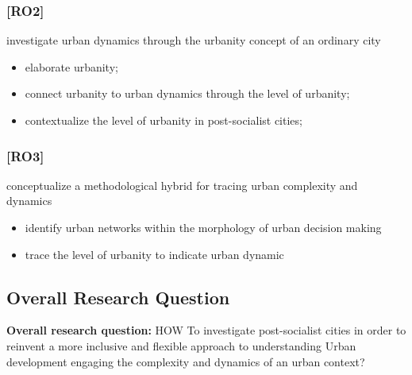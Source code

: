 \documentclass[11pt]{report}
\begin{document}
\subsubsection{[RO2]}
investigate urban dynamics through the urbanity concept of an ordinary city
\begin{itemize}
\item elaborate urbanity;
\item connect urbanity to urban dynamics through the level of urbanity;
\item contextualize the level of urbanity in post-socialist cities;
\end{itemize}

\subsubsection{[RO3]}
conceptualize a methodological hybrid for tracing urban complexity and dynamics
\begin{itemize}
\item identify urban networks within the morphology of urban decision making
\item trace the level of urbanity to indicate urban dynamic
\end{itemize}

\subsection{Overall Research Question}

\textbf{Overall research question:} HOW To investigate  post-socialist cities in order to reinvent a more inclusive and flexible approach to understanding Urban development engaging the complexity and dynamics of an urban context? 
\end{document}
